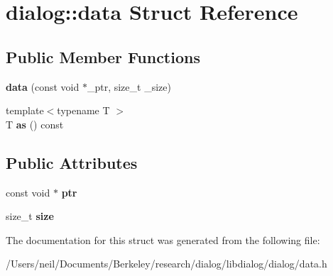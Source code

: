 \hypertarget{structdialog_1_1data}{}\section{dialog\+:\+:data Struct Reference}
\label{structdialog_1_1data}
\subsection*{Public Member Functions}
\begin{DoxyCompactItemize}
\item 
\mbox{\label{structdialog_1_1data_a67f95b3c190f4a2a990daff1fb6bf53c}} 
{\bfseries data} (const void $\ast$\+\_\+ptr, size\+\_\+t \+\_\+size)
\item 
\mbox{\label{structdialog_1_1data_a805239f9c1a7a87f33db10f42c036982}} 
{\footnotesize template$<$typename T $>$ }\\T {\bfseries as} () const
\end{DoxyCompactItemize}
\subsection*{Public Attributes}
\begin{DoxyCompactItemize}
\item 
\mbox{\label{structdialog_1_1data_aae8687e0660a1d3dd5ec1b6555b70c25}} 
const void $\ast$ {\bfseries ptr}
\item 
\mbox{\label{structdialog_1_1data_a44a7d81b5ae71a723cdfaa1dffb9d1e4}} 
size\+\_\+t {\bfseries size}
\end{DoxyCompactItemize}


The documentation for this struct was generated from the following file\+:\begin{DoxyCompactItemize}
\item 
/\+Users/neil/\+Documents/\+Berkeley/research/dialog/libdialog/dialog/data.\+h\end{DoxyCompactItemize}
